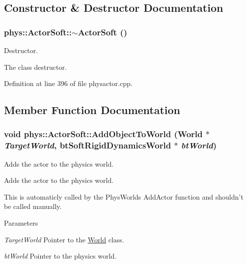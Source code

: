 \subsection{Constructor \& Destructor Documentation}
\hypertarget{classphys_1_1ActorSoft_a636c145f1e468fd45adc8da2a1708fbe}{
\subsubsection[{$\sim$ActorSoft}]{\setlength{\rightskip}{0pt plus 5cm}phys::ActorSoft::$\sim$ActorSoft ()}}
\label{d4/d23/classphys_1_1ActorSoft_a636c145f1e468fd45adc8da2a1708fbe}


Destructor. 

The class destructor. 

Definition at line 396 of file physactor.cpp.



\subsection{Member Function Documentation}
\hypertarget{classphys_1_1ActorSoft_a3a704ab32f847a5d0e060f8a592efefd}{
\subsubsection[{AddObjectToWorld}]{\setlength{\rightskip}{0pt plus 5cm}void phys::ActorSoft::AddObjectToWorld ({\bf World} $\ast$ {\em TargetWorld}, \/  btSoftRigidDynamicsWorld $\ast$ {\em btWorld})}}
\label{d4/d23/classphys_1_1ActorSoft_a3a704ab32f847a5d0e060f8a592efefd}


Adds the actor to the physics world. 

Adds the actor to the physics world. \par
 This is automaticly called by the PhysWorlds AddActor function and shouldn't be called manually. 
\begin{DoxyParams}{Parameters}
\item[{\em TargetWorld}]Pointer to the \hyperlink{classphys_1_1World}{World} class. \item[{\em btWorld}]Pointer to the physics world. \end{DoxyParams}


